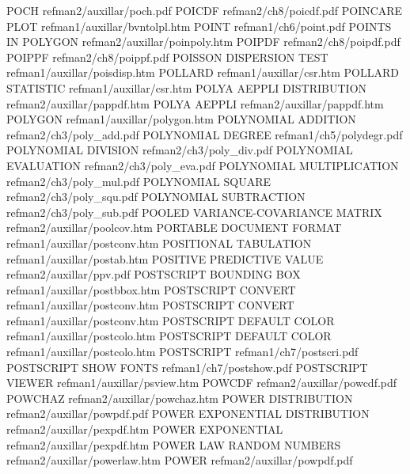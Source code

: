 POCH                                    refman2/auxillar/poch.pdf
POICDF                                  refman2/ch8/poicdf.pdf
POINCARE PLOT                           refman1/auxillar/bvntolpl.htm
POINT                                   refman1/ch6/point.pdf
POINTS IN POLYGON                       refman2/auxillar/poinpoly.htm
POIPDF                                  refman2/ch8/poipdf.pdf
POIPPF                                  refman2/ch8/poippf.pdf
POISSON DISPERSION TEST                 refman1/auxillar/poisdisp.htm
POLLARD                                 refman1/auxillar/csr.htm
POLLARD STATISTIC                       refman1/auxillar/csr.htm
POLYA AEPPLI DISTRIBUTION               refman2/auxillar/pappdf.htm
POLYA AEPPLI                            refman2/auxillar/pappdf.htm
POLYGON                                 refman1/auxillar/polygon.htm
POLYNOMIAL ADDITION                     refman2/ch3/poly_add.pdf
POLYNOMIAL DEGREE                       refman1/ch5/polydegr.pdf
POLYNOMIAL DIVISION                     refman2/ch3/poly_div.pdf
POLYNOMIAL EVALUATION                   refman2/ch3/poly_eva.pdf
POLYNOMIAL MULTIPLICATION               refman2/ch3/poly_mul.pdf
POLYNOMIAL SQUARE                       refman2/ch3/poly_squ.pdf
POLYNOMIAL SUBTRACTION                  refman2/ch3/poly_sub.pdf
POOLED VARIANCE-COVARIANCE MATRIX       refman2/auxillar/poolcov.htm
PORTABLE DOCUMENT FORMAT                refman1/auxillar/postconv.htm
POSITIONAL TABULATION                   refman1/auxillar/postab.htm
POSITIVE PREDICTIVE VALUE               refman2/auxillar/ppv.pdf
POSTSCRIPT BOUNDING BOX                 refman1/auxillar/postbbox.htm
POSTSCRIPT CONVERT                      refman1/auxillar/postconv.htm
POSTSCRIPT CONVERT                      refman1/auxillar/postconv.htm
POSTSCRIPT DEFAULT COLOR                refman1/auxillar/postcolo.htm
POSTSCRIPT DEFAULT COLOR                refman1/auxillar/postcolo.htm
POSTSCRIPT                              refman1/ch7/postscri.pdf
POSTSCRIPT SHOW FONTS                   refman1/ch7/postshow.pdf
POSTSCRIPT VIEWER                       refman1/auxillar/psview.htm
POWCDF                                  refman2/auxillar/powcdf.pdf
POWCHAZ                                 refman2/auxillar/powchaz.htm
POWER DISTRIBUTION                      refman2/auxillar/powpdf.pdf
POWER EXPONENTIAL DISTRIBUTION          refman2/auxillar/pexpdf.htm
POWER EXPONENTIAL                       refman2/auxillar/pexpdf.htm
POWER LAW RANDOM NUMBERS                refman2/auxillar/powerlaw.htm
POWER                                   refman2/auxillar/powpdf.pdf
